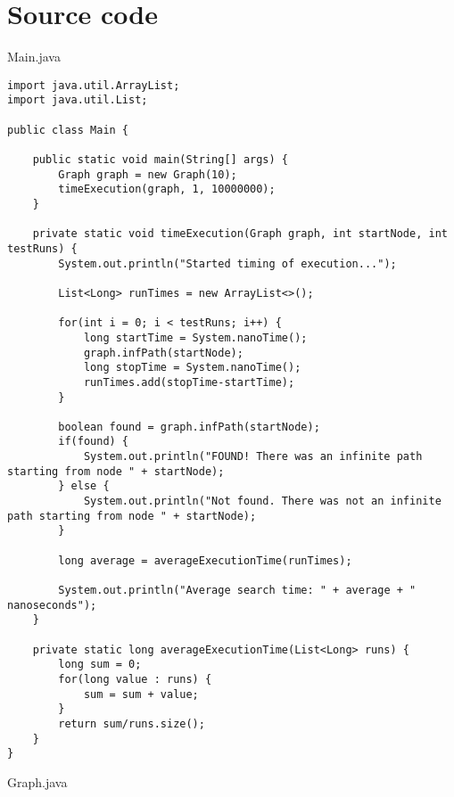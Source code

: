 \documentclass[]{article}
\begin{document}
\newpage

\section*{Source code}

Main.java

\begin{lstlisting}
import java.util.ArrayList;
import java.util.List;

public class Main {

	public static void main(String[] args) {
		Graph graph = new Graph(10);
		timeExecution(graph, 1, 10000000);
	}

	private static void timeExecution(Graph graph, int startNode, int testRuns) {
		System.out.println("Started timing of execution...");

		List<Long> runTimes = new ArrayList<>();

		for(int i = 0; i < testRuns; i++) {
			long startTime = System.nanoTime();
			graph.infPath(startNode);
			long stopTime = System.nanoTime();
			runTimes.add(stopTime-startTime);
		}

		boolean found = graph.infPath(startNode);
		if(found) {
			System.out.println("FOUND! There was an infinite path starting from node " + startNode);
		} else {
			System.out.println("Not found. There was not an infinite path starting from node " + startNode);
		}

		long average = averageExecutionTime(runTimes);

		System.out.println("Average search time: " + average + "  nanoseconds");
	}

	private static long averageExecutionTime(List<Long> runs) {
		long sum = 0;
		for(long value : runs) {
			sum = sum + value;
		}
		return sum/runs.size();
	}
}
\end{lstlisting}

Graph.java
\end{document}
